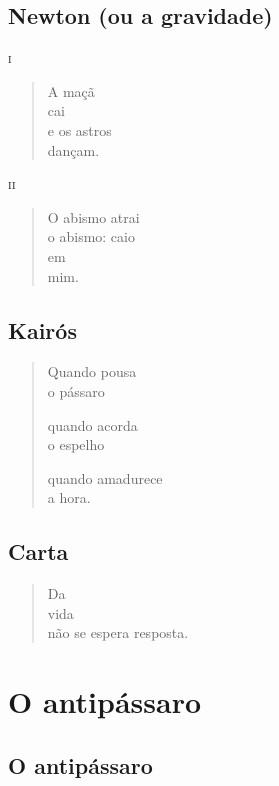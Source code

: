 \chapter{Newton (ou a gravidade)}

\forceindent\textsc{i}

\begin{verse}
A maçã\\
cai\\
e os astros\\
dançam.
\end{verse}

\medskip
\textsc{ii}

\begin{verse}
O abismo atrai\\
o abismo: caio\\
em\\
mim.
\end{verse}

\chapter{Kairós}

\begin{verse}
Quando pousa\\
o pássaro

quando acorda\\
o espelho

quando amadurece\\
a hora.
\end{verse}

\chapter{Carta}

\begin{verse}
Da\\
vida\\
não se espera resposta.
\end{verse}

\part*{O antipássaro}

\chapter{O antipássaro}

